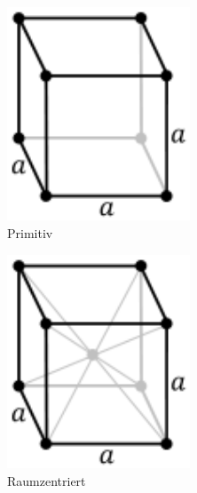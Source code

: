 \documentclass{school}
\begin{document}
\begin{figure}[!ht]
    \centering
    \begin{subfigure}[!ht]{0.2\textwidth}
        \centering
        \includegraphics[width=0.6\textwidth]{cubic.png}
        \caption[https://de.wikipedia.org/wiki/Bravais-Gitter]{Primitiv}
    \end{subfigure}
    \begin{subfigure}[!ht]{0.2\textwidth}
        \centering
        \includegraphics[width=0.6\textwidth]{cubic-centered.png}
        \caption[https://de.wikipedia.org/wiki/Bravais-Gitter]{Raumzentriert}
    \end{subfigure}
    \begin{subfigure}[!ht]{0.2\textwidth}
        \centering

\end{subfigure}
\end{figure}
\end{document}
